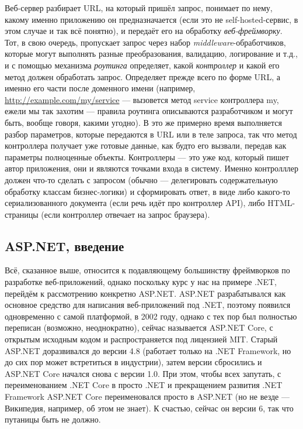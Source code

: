\documentclass{../../text-style}
\begin{document}
Веб-сервер разбирает URL, на который пришёл запрос, понимает по нему, какому именно приложению он предназначается (если это не self-hosted-сервис, в этом случае и так всё понятно), и передаёт его на обработку \emph{веб-фреймворку}. Тот, в свою очередь, пропускает запрос через набор \emph{middleware}-обработчиков, которые могут выполнять разные преобразования, валидацию, логирование и т.д., и с помощью механизма \emph{роутинга} определяет, какой \emph{контроллер} и какой его метод должен обработать запрос. Определяет прежде всего по форме URL, а именно его части после доменного имени (например, \url{http://example.com/my/service} --- вызовется метод service контроллера my, ежели мы так захотим --- правила роутинга описываются разработчиком и могут быть, вообще говоря, какими угодно). В это же примерно время выполняется разбор параметров, которые передаются в URL или в теле запроса, так что метод контроллера получает уже готовые данные, как будто его вызвали, передав как параметры полноценные объекты. Контроллеры --- это уже код, который пишет автор приложения, они и являются точками входа в систему. Именно контролллер должен что-то сделать с запросом (обычно --- делегировать содержательную обработку классам бизнес-логики) и сформировать ответ, в виде либо какого-то сериализованного документа (если речь идёт про контроллер API), либо HTML-страницы (если контроллер отвечает на запрос браузера).

\subsection{ASP.NET, введение}

Всё, сказанное выше, относится к подавляющему большинству фреймворков по разработке веб-приложений, однако поскольку курс у нас на примере .NET, перейдём  к рассмотрению конкретно ASP.NET. ASP.NET разрабатывался как основное средство для написания веб-приложений под .NET, поэтому появился одновременно с самой платформой, в 2002 году, однако с тех пор был полностью переписан (возможно, неоднократно), сейчас называется ASP.NET Core, с открытым исходным кодом и распространяется под лицензией MIT. Старый ASP.NET доразвивался до версии 4.8 (работает только на .NET Framework, но до сих пор может встретиться в индустрии), затем версии сбросились и ASP.NET Core начался снова с версии 1.0. При этом, чтобы всех запутать, с переименованием .NET Core в просто .NET и прекращением развития .NET Framework ASP.NET Core переименовался просто в ASP.NET (но не везде --- Википедия, например, об этом не знает). К счастью, сейчас он версии 6, так что путаницы быть не должно.
\end{document}
